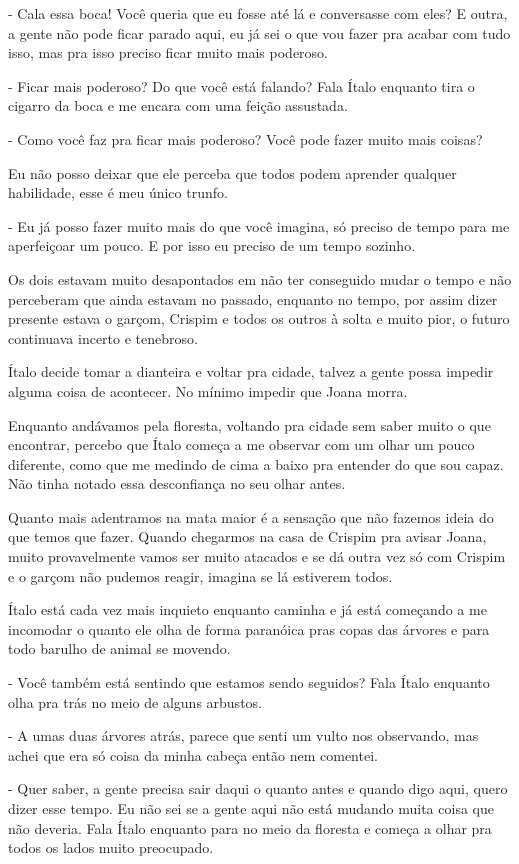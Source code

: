 - Cala essa boca! Você queria que eu fosse até lá e conversasse com eles? E outra, a gente não pode ficar parado aqui, eu já sei o que vou fazer pra acabar com tudo isso, mas pra isso preciso ficar muito mais poderoso. 

- Ficar mais poderoso? Do que você está falando? Fala Ítalo enquanto tira o cigarro da boca e me encara com uma feição assustada.

- Como você faz pra ficar mais poderoso? Você pode fazer muito mais coisas?

Eu não posso deixar que ele perceba que todos podem aprender qualquer habilidade, esse é meu único trunfo.

- Eu já posso fazer muito mais do que você imagina, só preciso de tempo para me aperfeiçoar um pouco. E por isso eu preciso de um tempo sozinho.

Os dois estavam muito desapontados em não ter conseguido mudar o tempo e não perceberam que ainda estavam no passado, enquanto no tempo, por assim dizer presente estava o garçom, Crispim e todos os outros à solta e muito pior, o futuro continuava incerto e tenebroso.

Ítalo decide tomar a dianteira e voltar pra cidade, talvez a gente possa impedir alguma coisa de acontecer. No mínimo impedir que Joana morra.

Enquanto andávamos pela floresta, voltando pra cidade sem saber muito o que encontrar,  percebo que Ítalo começa a me observar com um olhar um pouco diferente, como que me medindo de cima a baixo pra entender do que sou capaz. Não tinha notado essa desconfiança no seu olhar antes. 

Quanto mais adentramos na mata maior é a sensação que não fazemos ideia do que temos que fazer. Quando chegarmos na casa de Crispim pra avisar Joana, muito provavelmente vamos ser muito atacados e se dá outra vez só com Crispim e o garçom não pudemos reagir, imagina se lá estiverem todos.

Ítalo está cada vez mais inquieto enquanto caminha e já está começando a me incomodar o quanto ele olha de forma paranóica pras copas das árvores e para todo barulho de animal se movendo.

- Você também está sentindo que estamos sendo seguidos? Fala Ítalo enquanto olha pra trás no meio de alguns arbustos.

- A umas duas árvores atrás, parece que senti um vulto nos observando, mas achei que era só coisa da minha cabeça então nem comentei.

- Quer saber, a gente precisa sair daqui o quanto antes e quando digo aqui, quero dizer esse tempo. Eu não sei se a gente aqui não está mudando muita coisa que não deveria. Fala Ítalo enquanto para no meio da floresta e começa a olhar pra todos os lados muito preocupado.

